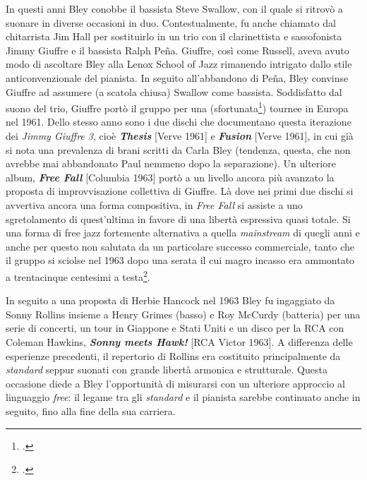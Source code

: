 In questi anni Bley conobbe il bassista Steve Swallow, con il quale si ritrovò a suonare in diverse occasioni in duo. Contestualmente, fu anche chiamato dal chitarrista Jim Hall per sostituirlo in un trio con il clarinettista e sassofonista Jimmy Giuffre e il bassista Ralph Peña. Giuffre, così come Russell, aveva avuto modo di ascoltare Bley alla Lenox School of Jazz rimanendo intrigato dallo stile anticonvenzionale del pianista. In seguito all'abbandono di Peña, Bley convinse Giuffre ad assumere (a scatola chiusa) Swallow come bassista. Soddisfatto dal suono del trio, Giuffre portò il gruppo per una (sfortunata\footcite[77]{stopping}) tournee in Europa nel 1961. Dello stesso anno sono i due dischi che documentano questa iterazione dei \textit{Jimmy Giuffre 3}, cioè \textit{\textbf{Thesis}} [Verve 1961] e \textit{\textbf{Fusion}} [Verve 1961], in cui già si nota una prevalenza di brani scritti da Carla Bley (tendenza, questa, che non avrebbe mai abbandonato Paul nemmeno dopo la separazione). Un ulteriore album, \textit{\textbf{Free Fall}} [Columbia 1963] portò a un livello ancora più avanzato la proposta di improvvisazione collettiva di Giuffre. Là dove nei primi due dischi si avvertiva ancora una forma compositiva, in \textit{Free Fall} si assiste a uno sgretolamento di quest'ultima in favore di una libertà espressiva quasi totale. Si una forma di free jazz fortemente alternativa a quella \textit{mainstream} di quegli anni e anche per questo non salutata da un particolare successo commerciale, tanto che il gruppo si sciolse nel 1963 dopo una serata il cui magro incasso era ammontato a trentacinque centesimi a testa\footcite{hamilton}.\par
In seguito a una proposta di Herbie Hancock nel 1963 Bley fu ingaggiato da Sonny Rollins insieme a Henry Grimes (basso) e Roy McCurdy (batteria) per una serie di concerti, un tour in Giappone e Stati Uniti e un disco per la RCA con Coleman Hawkins, \textit{\textbf{Sonny meets Hawk!}} [RCA Victor 1963]. A differenza delle esperienze precedenti, il repertorio di Rollins era costituito principalmente da \textit{standard} seppur suonati con grande libertà armonica e strutturale. Questa occasione diede a Bley l'opportunità di misurarsi con un ulteriore approccio al linguaggio \textit{free}: il legame tra gli \textit{standard} e il pianista sarebbe continuato anche in seguito, fino alla fine della sua carriera.
